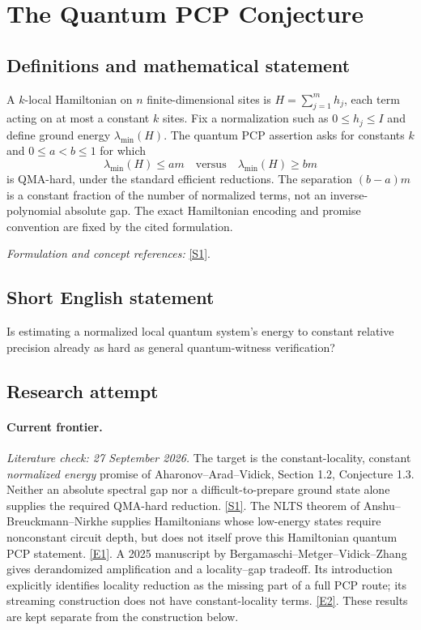 \documentclass[11pt,a4paper]{article}
\newcommand{\sref}[2]{\hyperlink{source:#1:#2}{[S#2]}}
\newcommand{\eref}[2]{\hyperlink{extra:#1:#2}{[E#2]}}
\newif\ifshowcatalogue
\newcommand{\cataloguescope}[1]{\ifshowcatalogue
 \paragraph{Exact scope in the supplied catalogue.}
 \begin{quote}\small #1\end{quote}\fi}
\numberwithin{equation}{section}
\begin{document}
\setcounter{section}{0}
\clearpage
\section*{\texorpdfstring{The Quantum PCP Conjecture}{The Quantum PCP Conjecture}}\label{30006691}
\subsection{Definitions and mathematical statement}
A $k$-local Hamiltonian on $n$ finite-dimensional sites is $H=\sum_{j=1}^m h_j$, each term acting on at most a constant $k$ sites. Fix a normalization such as $0\le h_j\le I$ and define ground energy $\lambda_{\min}(H)$. The quantum PCP assertion asks for constants $k$ and $0\le a<b\le1$ for which
\[
 \lambda_{\min}(H)\le am\quad\text{versus}\quad\lambda_{\min}(H)\ge bm
\]
is QMA-hard, under the standard efficient reductions. The separation $(b-a)m$ is a constant fraction of the number of normalized terms, not an inverse-polynomial absolute gap. The exact Hamiltonian encoding and promise convention are fixed by the cited formulation.
\par\smallskip\textit{Formulation and concept references:} \sref{30006691}{1}.
\cataloguescope{Prove or disprove that approximating the ground-state energy of a local Hamiltonian to within a constant additive fraction of its number of local terms is QMA-hard.}
\subsection{Short English statement}
Is estimating a normalized local quantum system's energy to constant relative precision already as hard as general quantum-witness verification?
\subsection{Research attempt}
\paragraph{Current frontier.}
\textit{Literature check: 27 September 2026.}
The target is the constant-locality, constant \emph{normalized energy}
promise of Aharonov--Arad--Vidick, Section 1.2, Conjecture 1.3.
Neither an absolute spectral gap nor a difficult-to-prepare ground state
alone supplies the required QMA-hard reduction. \sref{30006691}{1}.
The NLTS theorem of Anshu--Breuckmann--Nirkhe supplies Hamiltonians whose
low-energy states require nonconstant circuit depth, but does not itself
prove this Hamiltonian quantum PCP statement. \eref{30006691}{1}.
A 2025 manuscript by Bergamaschi--Metger--Vidick--Zhang gives derandomized
amplification and a locality--gap tradeoff. Its introduction explicitly
identifies locality reduction as the missing part of a full PCP route;
its streaming construction does not have constant-locality terms.
\eref{30006691}{2}. These results are kept separate from the construction below.
\end{document}
